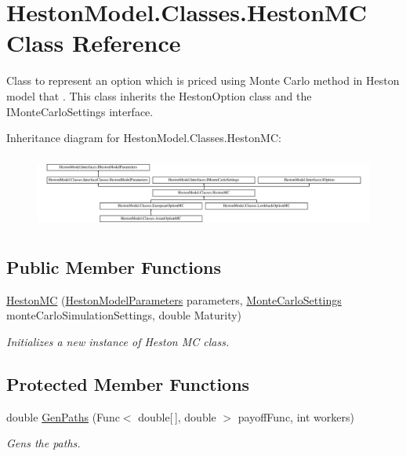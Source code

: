 \hypertarget{class_heston_model_1_1_classes_1_1_heston_m_c}{}\section{Heston\+Model.\+Classes.\+Heston\+MC Class Reference}
\label{class_heston_model_1_1_classes_1_1_heston_m_c}


Class to represent an option which is priced using Monte Carlo method in Heston model that . This class inherits the Heston\+Option class and the I\+Monte\+Carlo\+Settings interface.  


Inheritance diagram for Heston\+Model.\+Classes.\+Heston\+MC\+:\begin{figure}[H]
\begin{center}
\leavevmode
\includegraphics[height=2.443281cm]{class_heston_model_1_1_classes_1_1_heston_m_c}
\end{center}
\end{figure}
\subsection*{Public Member Functions}
\begin{DoxyCompactItemize}
\item 
\mbox{\hyperlink{class_heston_model_1_1_classes_1_1_heston_m_c_ad9ec790e8dddcfd8bdc4c05e8c8a913b}{Heston\+MC}} (\mbox{\hyperlink{class_heston_model_1_1_classes_1_1_interface_classes_1_1_heston_model_parameters}{Heston\+Model\+Parameters}} parameters, \mbox{\hyperlink{class_heston_model_1_1_classes_1_1_interface_classes_1_1_monte_carlo_settings}{Monte\+Carlo\+Settings}} monte\+Carlo\+Simulation\+Settings, double Maturity)
\begin{DoxyCompactList}\small\item\em Initializes a new instance of Heston MC class. \end{DoxyCompactList}\end{DoxyCompactItemize}
\subsection*{Protected Member Functions}
\begin{DoxyCompactItemize}
\item 
double \mbox{\hyperlink{class_heston_model_1_1_classes_1_1_heston_m_c_a726e96a32d76424524bb5bfda783e356}{Gen\+Paths}} (Func$<$ double\mbox{[}$\,$\mbox{]}, double $>$ payoff\+Func, int workers)
\begin{DoxyCompactList}\small\item\em Gens the paths. \end{DoxyCompactList}\end{DoxyCompactItemize}
